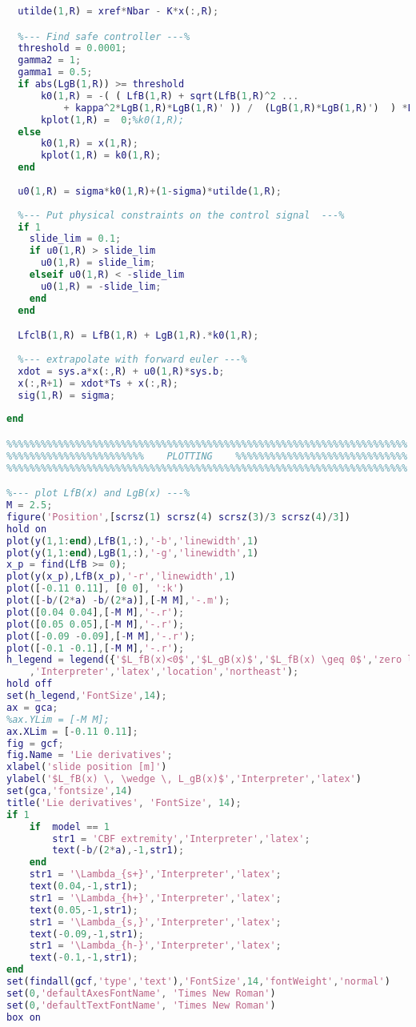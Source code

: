 \begin{lstlisting}[language=matlab]
  %-- Find controller by pole placement --%
  utilde(1,R) = xref*Nbar - K*x(:,R);

  %--- Find safe controller ---%
  threshold = 0.0001;
  gamma2 = 1;
  gamma1 = 0.5;
  if abs(LgB(1,R)) >= threshold
      k0(1,R) = -( ( LfB(1,R) + sqrt(LfB(1,R)^2 ...
          + kappa^2*LgB(1,R)*LgB(1,R)' )) /  (LgB(1,R)*LgB(1,R)')  ) *LgB(1,R);
      kplot(1,R) =  0;%k0(1,R);
  else
      k0(1,R) = x(1,R);
      kplot(1,R) = k0(1,R);
  end 
  
  u0(1,R) = sigma*k0(1,R)+(1-sigma)*utilde(1,R);
  
  %--- Put physical constraints on the control signal  ---%
  if 1
    slide_lim = 0.1;
    if u0(1,R) > slide_lim
      u0(1,R) = slide_lim;
    elseif u0(1,R) < -slide_lim
      u0(1,R) = -slide_lim;
    end
  end

  LfclB(1,R) = LfB(1,R) + LgB(1,R).*k0(1,R);
  
  %--- extrapolate with forward euler ---%
  xdot = sys.a*x(:,R) + u0(1,R)*sys.b;
  x(:,R+1) = xdot*Ts + x(:,R);
  sig(1,R) = sigma;
  
end

%%%%%%%%%%%%%%%%%%%%%%%%%%%%%%%%%%%%%%%%%%%%%%%%%%%%%%%%%%%%%%%%%%%%%%
%%%%%%%%%%%%%%%%%%%%%%%%    PLOTTING    %%%%%%%%%%%%%%%%%%%%%%%%%%%%%%
%%%%%%%%%%%%%%%%%%%%%%%%%%%%%%%%%%%%%%%%%%%%%%%%%%%%%%%%%%%%%%%%%%%%%%

%--- plot LfB(x) and LgB(x) ---%
M = 2.5;
figure('Position',[scrsz(1) scrsz(4) scrsz(3)/3 scrsz(4)/3])
hold on
plot(y(1,1:end),LfB(1,:),'-b','linewidth',1)
plot(y(1,1:end),LgB(1,:),'-g','linewidth',1)
x_p = find(LfB >= 0);
plot(y(x_p),LfB(x_p),'-r','linewidth',1)
plot([-0.11 0.11], [0 0], ':k')
plot([-b/(2*a) -b/(2*a)],[-M M],'-.m');
plot([0.04 0.04],[-M M],'-.r');
plot([0.05 0.05],[-M M],'-.r');
plot([-0.09 -0.09],[-M M],'-.r');
plot([-0.1 -0.1],[-M M],'-.r');
h_legend = legend({'$L_fB(x)<0$','$L_gB(x)$','$L_fB(x) \geq 0$','zero level'}...
    ,'Interpreter','latex','location','northeast');
hold off
set(h_legend,'FontSize',14);
ax = gca;
%ax.YLim = [-M M];
ax.XLim = [-0.11 0.11];
fig = gcf;
fig.Name = 'Lie derivatives';
xlabel('slide position [m]')
ylabel('$L_fB(x) \, \wedge \, L_gB(x)$','Interpreter','latex')
set(gca,'fontsize',14)
title('Lie derivatives', 'FontSize', 14);
if 1
    if  model == 1
        str1 = 'CBF extremity','Interpreter','latex';
        text(-b/(2*a),-1,str1);
    end
    str1 = '\Lambda_{s+}','Interpreter','latex';
    text(0.04,-1,str1);
    str1 = '\Lambda_{h+}','Interpreter','latex';
    text(0.05,-1,str1);
    str1 = '\Lambda_{s,}','Interpreter','latex';
    text(-0.09,-1,str1); 
    str1 = '\Lambda_{h-}','Interpreter','latex';
    text(-0.1,-1,str1); 
end
set(findall(gcf,'type','text'),'FontSize',14,'fontWeight','normal')
set(0,'defaultAxesFontName', 'Times New Roman')
set(0,'defaultTextFontName', 'Times New Roman')
box on



\end{lstlisting}
